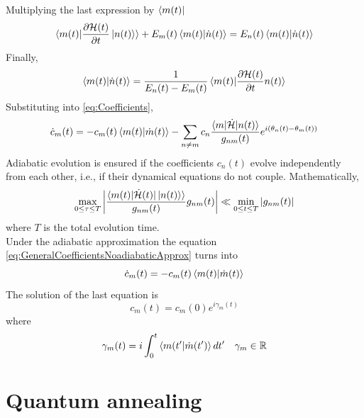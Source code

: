 Multiplying the last expression by $\bra{m(t)}$ 
\begin{equation}
    \braket{m(t)|\frac{\partial\mathcal{H}(t)}{\partial t}\ket{n(t)}} + E_{m}(t)\braket{m(t)|\dot{n}(t)} = E_{n}(t)\braket{m(t)|\dot{n}(t)}
\end{equation}
Finally,
\begin{equation}
    \braket{m(t)|\dot{n}(t)} = \frac{1}{E_{n}(t)-E_{m}(t)}\braket{m(t)|\frac{\partial \mathcal{H}(t)}{\partial t}n(t)}
\end{equation}
Substituting into \ref{eq:Coefficients},
\begin{equation}
\label{eq:GeneralCoefficientsNoadiabaticApprox}
    \dot{c}_{m}(t) = -c_{m}(t) \braket{m(t)|\dot{m}(t)} - \sum_{n\neq m} c_{n}\frac{\braket{m|\dot{\mathcal{H}}|n(t)}}{g_{nm}(t)}e^{i\left(\theta_{n}(t) - \theta_{m}(t)\right)}
\end{equation}
Adiabatic evolution is ensured if the coefficients $c_{n}(t)$ evolve independently from each other, i.e., if their dynamical equations do not couple. Mathematically,
\begin{equation}
    \max_{0 \leq \tau \leq T} \abs{\frac{\braket{m(t)|\dot{\mathcal{H}}(t)|\ket{n(t)}}}{g_{nm}(t)}{g_{nm}(t)}} \ll \min_{0\leq t \leq T} \abs{g_{nm}(t)}
\end{equation}
where $T$ is the total evolution time.\\ 
Under the adiabatic approximation the equation \ref{eq:GeneralCoefficientsNoadiabaticApprox} turns into
\begin{equation}
    \dot{c}_{m}(t) = -c_{m}(t)\braket{m(t)|\dot{m}(t)}
\end{equation}
The solution of the last equation is
\begin{equation}
    c_{m}(t) = c_{m}(0)e^{i\gamma_{m}(t)}
\end{equation}
where
\begin{equation}
    \gamma_{m}(t) = i\int_{0}^{t}\braket{m(t^{\prime}|\dot{m}(t^{\prime})}dt^{\prime} \quad \gamma_{m}\in \mathbb{R}
\end{equation}

\section{Quantum annealing}

